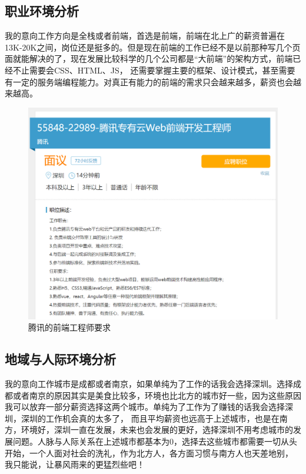 \documentclass{article}
\begin{document}
\subsection{职业环境分析}
我的意向工作方向是全栈或者前端，首选是前端，前端在北上广的薪资普遍在13K-20K之间，岗位还是挺多的。但是现在前端的工作已经不是以前那种写几个页面就能解决的了，现在发展比较科学的几个公司都是“大前端”的架构方式，前端已经不止需要会CSS、HTML、JS，
还需要掌握主要的框架、设计模式，甚至需要有一定的服务端编程能力。对真正有能力的前端的需求只会越来越多，薪资也会越来越高。
\begin{figure}[h!]
\centering
\includegraphics[scale=0.2]{gongzuo.png}
\caption{腾讯的前端工程师要求}
\label{fig:job}
\end{figure}

\subsection{地域与人际环境分析}
我的意向工作城市是成都或者南京，如果单纯为了工作的话我会选择深圳。选择成都或者南京的原因其实是美食比较多，环境也比北方的城市好一些，因为这些原因我可以放弃一部分薪资选择这两个城市。单纯为了工作为了赚钱的话我会选择深圳，深圳的工作机会真的太多了，
而且平均薪资也远高于上述城市，也是在南方，环境好，深圳一直在发展，未来也会发展的更好，选择深圳不用考虑城市的发展问题。人脉与人际关系在上述城市都基本为0，选择去这些城市都需要一切从头开始，一个人面对社会的洗礼，作为北方人，各方面习惯与南方人也天差地别，
我只能说，让暴风雨来的更猛烈些吧！
\end{document}
